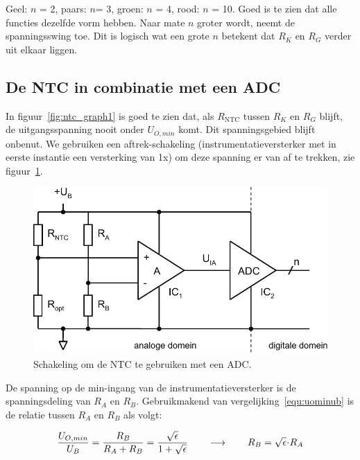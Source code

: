 \documentclass[12pt,a4paper,final,twoside,fleqn]{article}
\newcommand{\rntc}{R_\text{NTC}}
\let\oldcdot\cdot
\renewcommand{\cdot}{\kern-.10em\oldcdot\kern-.10em}
\begin{document}
Geel: $n$ = 2, paars: $n $= 3, groen: $n$ = 4, rood: $n$ = 10. Goed is te zien
dat alle functies dezelfde vorm hebben. Naar mate $n$ groter wordt, neemt de
spanningsswing toe. Dit is logisch wat een grote $n$ betekent dat $R_K$ en $R_G$
verder uit elkaar liggen.


\subsection{De NTC in combinatie met een ADC}

In figuur~\ref{fig:ntc_graph1} is goed te zien dat, als $\rntc$ tussen $R_K$ en
$R_G$ blijft, de uitgangsspanning nooit onder $U_{O,min}$ komt. Dit spanningsgebied
blijft onbenut. We gebruiken een aftrek-schakeling (instrumentatieversterker met in
eerste instantie een versterking van 1x) om deze spanning er van af te trekken, zie
figuur~\ref{fig:ntc_ampli}.

\begin{figure}[ht!]
\centering
\includegraphics[scale=0.63]{drawings/ntc_ampli}
\caption{Schakeling om de NTC te gebruiken met een ADC.}
\label{fig:ntc_ampli}
\end{figure}


De spanning op de min-ingang van de instrumentatieversterker is de spanningsdeling
van $R_A$ en $R_B$. Gebruikmakend van vergelijking~\eqref{equ:uominub} is de relatie
tussen $R_A$ en $R_B$ als volgt:

\begin{equation}
\dfrac{U_{O,min}}{U_B} = \dfrac{R_B}{R_A+R_B} = \dfrac{\sqrt{\epsilon}}{1+\sqrt{\epsilon}} \qquad\longrightarrow\qquad R_B = \sqrt{\epsilon}\cdot R_A
\end{equation}
\end{document}
